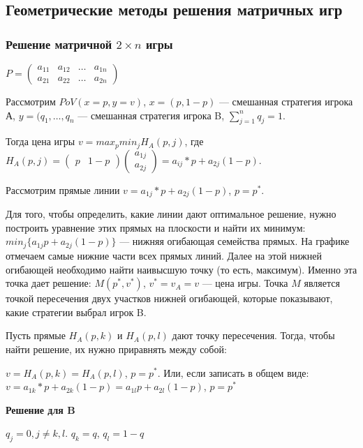 \documentclass{article}
\begin{document}
\subsection{Геометрические методы решения матричных игр}

\subsubsection{Решение матричной $2 \times n$ игры}

$P = \begin{pmatrix}
	a_{11} & a_{12} & \dots & a_{1n} \\
	a_{21} & a_{22} & \dots & a_{2n}
\end{pmatrix}$

Рассмотрим $PoV (x = p, y = v)$, $x = (p, 1 - p)$ — смешанная стратегия игрока А, $y = (q_{1}, \dots, q_{n}$ — смешанная стратегия игрока B, $\sum\limits_{j = 1}^{n} q_{j} = 1$.

Тогда цена игры $v = max_{p} min_{j} H_{A}(p, j)$, где $H_{A}(p, j) = \begin{pmatrix} p & 1 - p \end{pmatrix} \begin{pmatrix} a_{1j} \\ a_{2j} \end{pmatrix} = a_{ij} * p + a_{2j} (1 - p)$.

Рассмотрим прямые линии $v = a_{1j} * p + a_{2j} (1 - p)$, $p = p^{*}$.

Для того, чтобы определить, какие линии дают оптимальное решение, нужно построить уравнение этих прямых на плоскости и найти их минимум: $min_{j} \{ a_{1j}p + a_{2j}(1 - p) \}$ — нижняя огибающая семейства прямых. На графике отмечаем самые нижние части всех прямых линий. Далее на этой нижней огибающей необходимо найти наивысшую точку (то есть, максимум). Именно эта точка дает решение: $M(p^{*}, v^{*})$, $v^{*} = v_{A} = v$ — цена игры. Точка $M$ является точкой пересечения двух участков нижней огибающей, которые показывают, какие стратегии выбрал игрок B.

Пусть прямые $H_{A}(p, k)$ и $H_{A}(p, l)$ дают точку пересечения. Тогда, чтобы найти решение, их нужно приравнять между собой:

$v = H_{A}(p, k) = H_{A}(p, l)$, $p = p^{*}$. Или, если записать в общем виде: $v = a_{1k} * p + a_{2k} (1 - p) = a_{1l}p + a_{2l}(1 - p)$, $p=p^{*}$

\textbf{Решение для B}

$q_j = 0, j \ne k,l$. $q_{k} = q$, $q_{l} = 1 - q$
\end{document}
